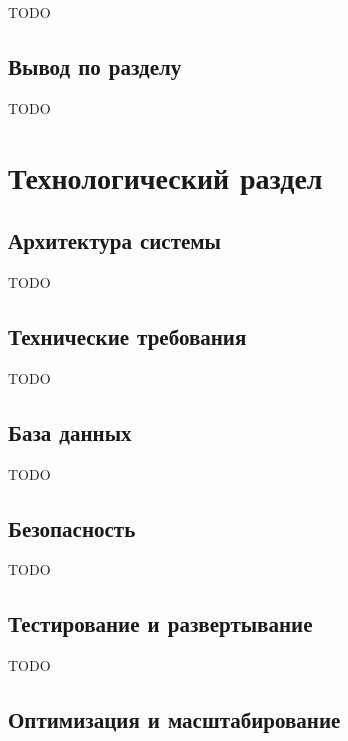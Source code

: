 \documentclass{mirea}
\begin{document}
TODO

\begin{comment}
\subsection{Монетизация и бизнес-модель}
\subsection{Планы по развитию и масштабированию}
\end{comment}

\subsection*{Вывод по разделу}

TODO

\section{Технологический раздел}

\subsection{Архитектура системы}

TODO

\subsection{Технические требования}

TODO

\subsection{База данных}

TODO

\subsection{Безопасность}

TODO

\subsection{Тестирование и развертывание}

TODO

\subsection{Оптимизация и масштабирование}
\end{document}
